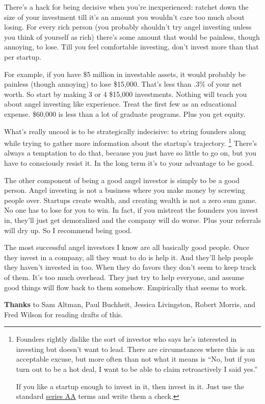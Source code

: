 There's a hack for being decisive when you're inexperienced: ratchet
down the size of your investment till it's an amount you wouldn't care
too much about losing. For every rich person (you probably shouldn't try
angel investing unless you think of yourself as rich) there's some
amount that would be painless, though annoying, to lose. Till you feel
comfortable investing, don't invest more than that per startup.

For example, if you have \$5 million in investable assets, it would
probably be painless (though annoying) to lose \$15,000. That's less
than .3\% of your net worth. So start by making 3 or 4 \$15,000
investments. Nothing will teach you about angel investing like
experience. Treat the first few as an educational expense. \$60,000 is
less than a lot of graduate programs. Plus you get equity.

What's really uncool is to be strategically indecisive: to string
founders along while trying to gather more information about the
startup's trajectory. \footnote{Founders rightly dislike the sort of investor who says he's
interested in investing but doesn't want to lead. There are
circumstances where this is an acceptable excuse, but more often than
not what it means is ``No, but if you turn out to be a hot deal, I want
to be able to claim retroactively I said yes.''

If you like a startup enough to invest in it, then invest in it. Just
use the standard \href{http://ycombinator.com/seriesaa.html}{series AA}
terms and write them a check.} There's always a
temptation to do that, because you just have so little to go on, but you
have to consciously resist it. In the long term it's to your advantage
to be good.

The other component of being a good angel investor is simply to be a
good person. Angel investing is not a business where you make money by
screwing people over. Startups create wealth, and creating wealth is not
a zero sum game. No one has to lose for you to win. In fact, if you
mistreat the founders you invest in, they'll just get demoralized and
the company will do worse. Plus your referrals will dry up. So I
recommend being good.

The most successful angel investors I know are all basically good
people. Once they invest in a company, all they want to do is help it.
And they'll help people they haven't invested in too. When they do
favors they don't seem to keep track of them. It's too much overhead.
They just try to help everyone, and assume good things will flow back to
them somehow. Empirically that seems to work.


\textbf{Thanks} to Sam Altman, Paul Buchheit, Jessica Livingston, Robert
Morris, and Fred Wilson for reading drafts of this.